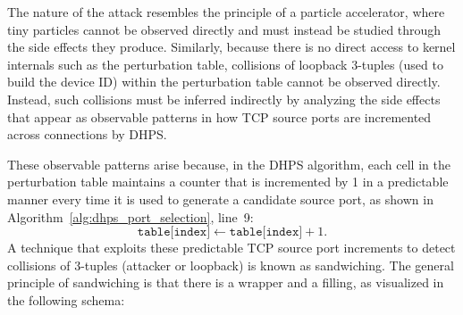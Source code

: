 \documentclass{report}
\begin{document}

The nature of the attack resembles the principle of a \alert{particle accelerator}, where tiny particles cannot be observed directly and must instead be studied through the side effects they produce. Similarly, because there is no direct access to kernel internals such as the perturbation table, collisions of loopback 3-tuples (used to build the device ID) within the perturbation table \alert{cannot be observed directly}. Instead, such collisions must be inferred indirectly by analyzing the side effects that appear as observable patterns in how TCP source ports are incremented across connections by DHPS.

These observable patterns arise because, in the DHPS algorithm, each cell in the perturbation table maintains a counter that is incremented by 1 in a predictable manner every time it is used to generate a candidate source port, as shown in Algorithm~\ref{alg:dhps_port_selection}, line~9:
\[
\texttt{table[index]} \leftarrow \texttt{table[index]} + 1.
\]
A technique that exploits these predictable TCP source port increments to detect collisions of 3-tuples (attacker or loopback) is known as \alert{sandwiching}. The general principle of sandwiching is that there is a \alert{wrapper} and a \alert{filling}, as visualized in the following schema:
\end{document}
